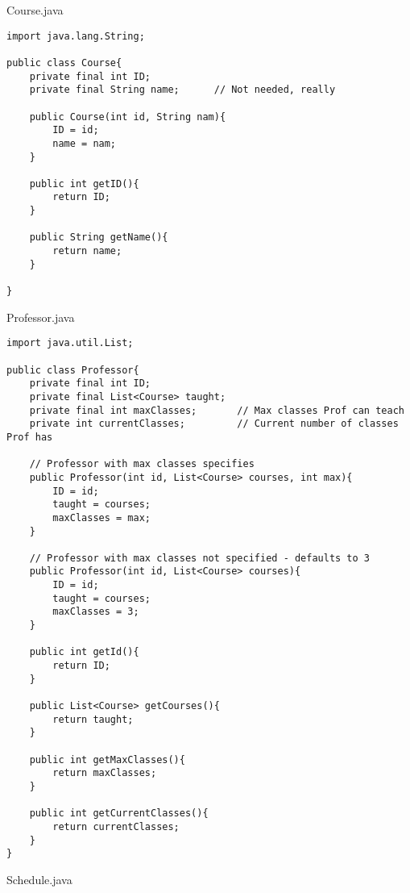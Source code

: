 \documentclass{article}
\begin{document}
Course.java
\begin{lstlisting}
import java.lang.String;

public class Course{
	private final int ID;
	private final String name; 		// Not needed, really

	public Course(int id, String nam){
		ID = id;
		name = nam;
	}

	public int getID(){
		return ID;
	}

	public String getName(){
		return name;
	}

}
\end{lstlisting}
Professor.java
\begin{lstlisting}
import java.util.List;

public class Professor{
	private final int ID;
	private final List<Course> taught;
	private final int maxClasses;		// Max classes Prof can teach
	private int currentClasses;			// Current number of classes Prof has

	// Professor with max classes specifies
	public Professor(int id, List<Course> courses, int max){
		ID = id;
		taught = courses;
		maxClasses = max;
	}

	// Professor with max classes not specified - defaults to 3
	public Professor(int id, List<Course> courses){
		ID = id;
		taught = courses;
		maxClasses = 3;
	}

	public int getId(){
		return ID;
	}

	public List<Course> getCourses(){
		return taught;
	}

	public int getMaxClasses(){
		return maxClasses;
	}

	public int getCurrentClasses(){
		return currentClasses;
	}
}
\end{lstlisting}
Schedule.java
\end{document}
